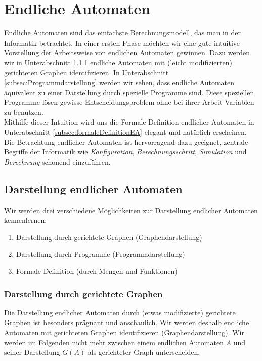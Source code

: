 \chapter{Endliche Automaten}
Endliche Automaten sind das einfachste Berechnungsmodell, das man in der Informatik
betrachtet. In einer ersten Phase möchten wir eine gute intuitive Vorstellung der Arbeitsweise von endlichen Automaten gewinnen. Dazu werden wir in Unterabschnitt \cref{subsec:graphenDarstellung} endliche Automaten mit (leicht modifizierten) gerichteten Graphen identifizieren. In Unterabschnitt \cref{subsec:Programmdarstellung} werden wir sehen, dass endliche Automaten äquivalent zu einer Darstellung durch spezielle Programme sind. Diese speziellen Programme lösen gewisse Entscheidungsproblem ohne bei ihrer Arbeit Variablen zu benutzen.\\
Mithilfe dieser Intuition wird uns die Formale Definition endlicher Automaten in Unterabschnitt \cref{subsec:formaleDefinitionEA} elegant und natürlich erscheinen.\\
Die Betrachtung endlicher Automaten ist hervorragend dazu geeignet, zentrale Begriffe der Informatik wie \textit{Konfiguration}, \textit{Berechnungsschritt}, \textit{Simulation} und \textit{Berechnung} schonend einzuführen.\\

\section{Darstellung endlicher Automaten}
Wir werden drei verschiedene Möglichkeiten zur Darstellung endlicher Automaten kennenlernen:
\begin{enumerate}
	\item Darstellung durch gerichtete Graphen (Graphendarstellung)
	\item Darstellung durch Programme (Programmdarstellung)
	\item Formale Definition (durch Mengen und Funktionen)
\end{enumerate}

\subsection{Darstellung durch gerichtete Graphen}\label{subsec:graphenDarstellung}
Die Darstellung endlicher Automaten durch (etwas modifizierte) gerichtete Graphen ist besonders prägnant und anschaulich. Wir werden deshalb endliche Automaten mit gerichteten Graphen identifizieren (Graphendarstellung). Wir werden im Folgenden nicht mehr zwischen einem endlichen Automaten $A$ und seiner Darstellung $G(A)$ als gerichteter Graph unterscheiden.\\

